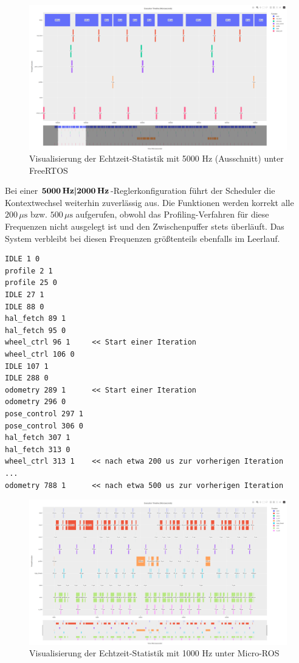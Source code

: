 \begin{figure}[H]
    \centering
    \includegraphics[width=1\textwidth]{assets/freertos_profiling_5000hz_ausschnitt}
    \caption{Visualisierung der Echtzeit-Statistik mit 5000 Hz (Ausschnitt)
    unter FreeRTOS}
\end{figure}

Bei einer $\textbf{5000\,\text{Hz}|2000\,\text{Hz}}$-Reglerkonfiguration führt
der Scheduler die Kontextwechsel weiterhin zuverlässig aus. Die Funktionen
werden korrekt alle $200\,\mu\text{s}$ bzw. $500\,\mu\text{s}$ aufgerufen,
obwohl das Profiling-Verfahren für diese Frequenzen nicht ausgelegt ist und den
Zwischenpuffer stets überläuft. Das System verbleibt bei diesen Frequenzen
größtenteils ebenfalls im Leerlauf.

\begin{code}
\begin{verbatim}
IDLE 1 0
profile 2 1
profile 25 0
IDLE 27 1
IDLE 88 0
hal_fetch 89 1
hal_fetch 95 0
wheel_ctrl 96 1     << Start einer Iteration
wheel_ctrl 106 0
IDLE 107 1
IDLE 288 0
odometry 289 1      << Start einer Iteration
odometry 296 0
pose_control 297 1
pose_control 306 0
hal_fetch 307 1
hal_fetch 313 0
wheel_ctrl 313 1    << nach etwa 200 us zur vorherigen Iteration
...
odometry 788 1      << nach etwa 500 us zur vorherigen Iteration
\end{verbatim}
\end{code}

\begin{figure}[H]
    \centering
    \includegraphics[width=1\textwidth]{assets/micro_ros_profiling_1000hz}
    \caption{Visualisierung der Echtzeit-Statistik mit 1000 Hz unter Micro-ROS}
\end{figure}

